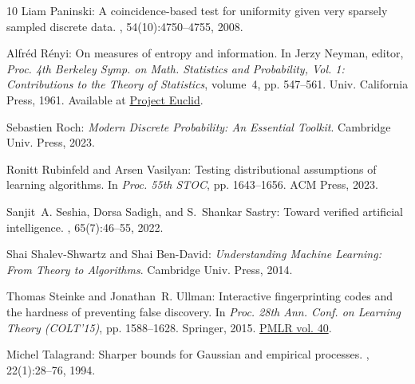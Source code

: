 \documentclass[11pt]{article}
\begin{document}
\begin{thebibliography}{10}
{\sc Liam Paninski}: A coincidence-based test for uniformity given very
  sparsely sampled discrete data.
, 54(10):4750--4755, 2008.

{\sc Alfr{\'e}d R{\'e}nyi}: On measures of entropy and information.
\newblock In {\sc Jerzy Neyman}, editor, {\em Proc. 4th Berkeley Symp. on Math.
  Statistics and Probability, Vol. 1: Contributions to the Theory of
  Statistics}, volume~4, pp. 547--561. Univ. California Press, 1961.
\newblock Available at
  \href{https://projecteuclid.org/ebook/download?urlId=bsmsp/1200512181&isFullBook=false}{Project
  Euclid}.

{\sc Sebastien Roch}: {\em Modern Discrete Probability: {A}n Essential
  Toolkit}.
\newblock Cambridge Univ. Press, 2023.
\newblock [\epfmtdoi{10.1017/9781009305129}]

{\sc Ronitt Rubinfeld and Arsen Vasilyan}: Testing distributional assumptions
  of learning algorithms.
\newblock In {\em Proc. 55th STOC}, pp. 1643--1656. ACM Press, 2023.

{\sc Sanjit~A. Seshia, Dorsa Sadigh, and S.~Shankar Sastry}: Toward verified
  artificial intelligence.
, 65(7):46--55, 2022.
\newblock [\epfmtdoi{10.1145/3503914}]

{\sc Shai Shalev{-}Shwartz and Shai Ben{-}David}: {\em Understanding Machine
  Learning: From Theory to Algorithms}.
\newblock Cambridge Univ. Press, 2014.

{\sc Thomas Steinke and Jonathan~R. Ullman}: Interactive fingerprinting codes
  and the hardness of preventing false discovery.
\newblock In {\em Proc. 28th Ann. Conf. on Learning Theory (COLT'15)}, pp.
  1588--1628. Springer, 2015.
\newblock \href{http://proceedings.mlr.press/v40/Steinke15.html}{PMLR vol. 40}.

{\sc Michel Talagrand}: Sharper bounds for {G}aussian and empirical processes.
, 22(1):28--76, 1994.


\end{thebibliography}
\end{document}
